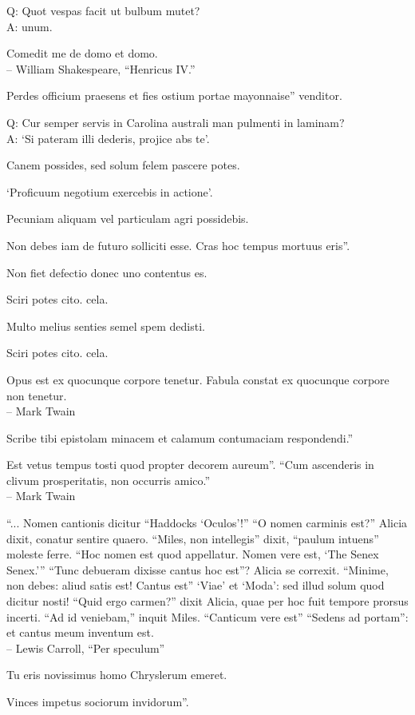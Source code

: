 \documentclass[titlepage,12pt]{memoir}
\begin{document}
Q: Quot vespas facit ut bulbum mutet?\\
A: unum.

Comedit me de domo et domo.
\\-- William Shakespeare, “Henricus IV.”

Perdes officium praesens et fies ostium portae mayonnaise”
venditor.

Q: Cur semper servis in Carolina australi man
pulmenti in laminam?\\
A: ‘Si pateram illi dederis, projice abs te’.

Canem possides, sed solum felem pascere potes.

‘Proficuum negotium exercebis in actione’.

 Pecuniam aliquam vel particulam agri possidebis.

Non debes iam de futuro solliciti esse. Cras hoc tempus mortuus eris”.

Non fiet defectio donec uno contentus es.

Sciri potes cito. cela.

Multo melius senties semel spem dedisti.

Sciri potes cito. cela.

Opus est ex quocunque corpore tenetur.
Fabula constat ex quocunque corpore non tenetur.
\\-- Mark Twain

Scribe tibi epistolam minacem et calamum contumaciam respondendi.”

Est vetus tempus tosti quod propter decorem aureum”.
“Cum ascenderis in clivum prosperitatis, non occurris amico.”
\\-- Mark Twain

 “... Nomen cantionis dicitur “Haddocks ‘Oculos’!”
“O nomen carminis est?” Alicia dixit, conatur
sentire quaero.
“Miles, non intellegis” dixit, “paulum intuens”
moleste ferre. “Hoc nomen est quod appellatur. Nomen vere est, ‘The Senex
Senex.’”
“Tunc debueram dixisse cantus hoc est”?
Alicia se correxit.
“Minime, non debes: aliud satis est! Cantus est”
‘Viae’ et ‘Moda’: sed illud solum quod dicitur nosti!
“Quid ergo carmen?” dixit Alicia, quae per hoc fuit
tempore prorsus incerti.
“Ad id veniebam,” inquit Miles. “Canticum vere est”
“Sedens ad portam”: et cantus meum inventum est.
\\-- Lewis Carroll, “Per speculum”

Tu eris novissimus homo Chryslerum emeret.

Vinces impetus sociorum invidorum”.
\end{document}
